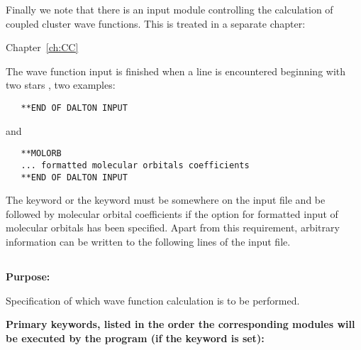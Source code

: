 \noindent
Finally we note that there is an input module controlling the
calculation of coupled cluster wave functions. This is treated in a
separate chapter:

Chapter~\ref{ch:CC} 

\bigskip
\noindent
The wave function input is finished when a line is encountered beginning
with two stars {\starstarkey}, two examples:

\begin{inputex} \begin{verbatim}
   **END OF DALTON INPUT
\end{verbatim} \end{inputex}
and

\begin{inputex} \begin{verbatim}
   **MOLORB
   ... formatted molecular orbitals coefficients
   **END OF DALTON INPUT
\end{verbatim} \end{inputex}

\noindent
The  keyword or the  keyword
must be somewhere on the input file and be
followed by molecular orbital coefficients if the option for formatted
input of molecular orbitals has been specified.  Apart from this
requirement, arbitrary information can be written to the following lines
of the input file.



\pagebreak[3]
\subsection{\label{ref-geninp}}

{\bf Purpose:}

Specification of which wave function calculation is to be performed.

{\bf Primary keywords, {\color{red} listed in the order the corresponding modules
 will be executed by the program (if the keyword is set)}: }

